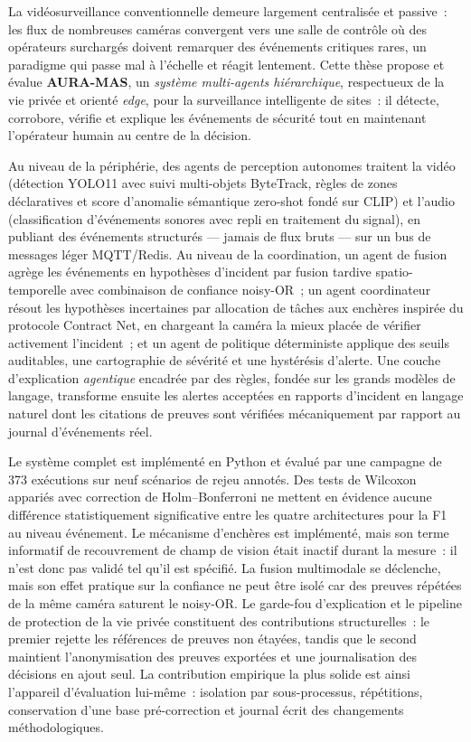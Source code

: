 \documentclass[openany,12pt,oneside]{extreport}
\begin{document}
La vidéosurveillance conventionnelle demeure largement centralisée et passive~: les flux de nombreuses caméras convergent vers une salle de contrôle où des opérateurs surchargés doivent remarquer des événements critiques rares, un paradigme qui passe mal à l'échelle et réagit lentement. Cette thèse propose et évalue \textbf{AURA-MAS}, un \emph{système multi-agents hiérarchique}, respectueux de la vie privée et orienté \emph{edge}, pour la surveillance intelligente de sites~: il détecte, corrobore, vérifie et explique les événements de sécurité tout en maintenant l'opérateur humain au centre de la décision.

Au niveau de la périphérie, des agents de perception autonomes traitent la vidéo (détection YOLO11 avec suivi multi-objets ByteTrack, règles de zones déclaratives et score d'anomalie sémantique zero-shot fondé sur CLIP) et l'audio (classification d'événements sonores avec repli en traitement du signal), en publiant des événements structurés --- jamais de flux bruts --- sur un bus de messages léger MQTT/Redis. Au niveau de la coordination, un agent de fusion agrège les événements en hypothèses d'incident par fusion tardive spatio-temporelle avec combinaison de confiance noisy-OR~; un agent coordinateur résout les hypothèses incertaines par allocation de tâches aux enchères inspirée du protocole Contract Net, en chargeant la caméra la mieux placée de vérifier activement l'incident~; et un agent de politique déterministe applique des seuils auditables, une cartographie de sévérité et une hystérésis d'alerte. Une couche d'explication \emph{agentique} encadrée par des règles, fondée sur les grands modèles de langage, transforme ensuite les alertes acceptées en rapports d'incident en langage naturel dont les citations de preuves sont vérifiées mécaniquement par rapport au journal d'événements réel.

Le système complet est implémenté en Python et évalué par une campagne de 373 exécutions sur neuf scénarios de rejeu annotés. Des tests de Wilcoxon appariés avec correction de Holm--Bonferroni ne mettent en évidence aucune différence statistiquement significative entre les quatre architectures pour la F1 au niveau événement. Le mécanisme d'enchères est implémenté, mais son terme informatif de recouvrement de champ de vision était inactif durant la mesure~: il n'est donc pas validé tel qu'il est spécifié. La fusion multimodale se déclenche, mais son effet pratique sur la confiance ne peut être isolé car des preuves répétées de la même caméra saturent le noisy-OR. Le garde-fou d'explication et le pipeline de protection de la vie privée constituent des contributions structurelles~: le premier rejette les références de preuves non étayées, tandis que le second maintient l'anonymisation des preuves exportées et une journalisation des décisions en ajout seul. La contribution empirique la plus solide est ainsi l'appareil d'évaluation lui-même~: isolation par sous-processus, répétitions, conservation d'une base pré-correction et journal écrit des changements méthodologiques.
\end{document}

